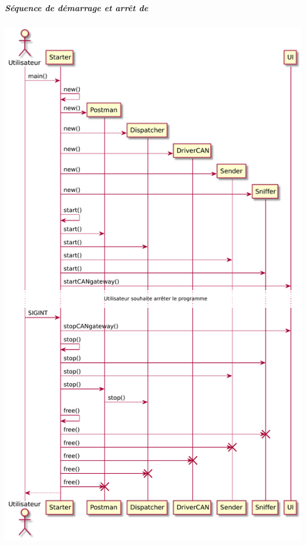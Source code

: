 \newpage 

\subparagraph{Séquence de démarrage et arrêt de {\nomLogiciel} \newline}

\medspace

\begin{minipage}
    {\linewidth}
    \centering
    \includegraphics[height=0.9\textheight]{../schemas/Conception_detaillee/diag_sequence_Starter.pdf}
\end{minipage}

